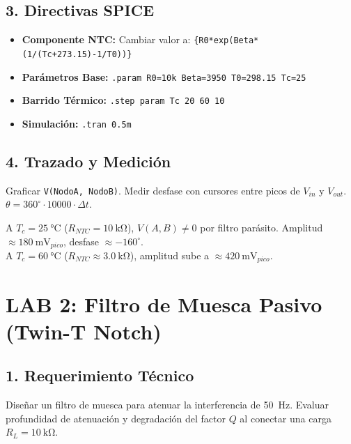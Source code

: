 \documentclass[11pt,a4paper,twoside]{article}
\newcommand{\param}[1]{\texttt{\color{spicered}#1}}
\begin{document}
\subsection{3. Directivas SPICE}
\begin{spicecmd}
\begin{itemize}[itemsep=1pt]
    \item \textbf{Componente NTC:} Cambiar valor a: \param{\{R0*exp(Beta*(1/(Tc+273.15)-1/T0))\}}
    \item \textbf{Parámetros Base:} \param{.param R0=10k Beta=3950 T0=298.15 Tc=25}
    \item \textbf{Barrido Térmico:} \param{.step param Tc 20 60 10}
    \item \textbf{Simulación:} \param{.tran 0.5m}
\end{itemize}
\end{spicecmd}

\subsection{4. Trazado y Medición}
Graficar \param{V(NodoA, NodoB)}. Medir desfase con cursores entre picos de $V_{in}$ y $V_{out}$. $\theta = 360^\circ \cdot 10000 \cdot \Delta t$.

\begin{resultado}
A $T_c = \qty{25}{\celsius}$ ($R_{NTC} = \qty{10}{\kilo\ohm}$), $V(A,B) \neq 0$ por filtro parásito. Amplitud $\approx \qty{180}{\milli\volt}_{pico}$, desfase $\approx -160^\circ$.\\
A $T_c = \qty{60}{\celsius}$ ($R_{NTC} \approx \qty{3.0}{\kilo\ohm}$), amplitud sube a $\approx \qty{420}{\milli\volt}_{pico}$.
\end{resultado}

\newpage
\section{LAB 2: Filtro de Muesca Pasivo (Twin-T Notch)}\label{lab2}

\subsection{1. Requerimiento Técnico}
Diseñar un filtro de muesca para atenuar la interferencia de \qty{50}{\hertz}. Evaluar profundidad de atenuación y degradación del factor $Q$ al conectar una carga $R_L = \qty{10}{\kilo\ohm}$.
\end{document}
